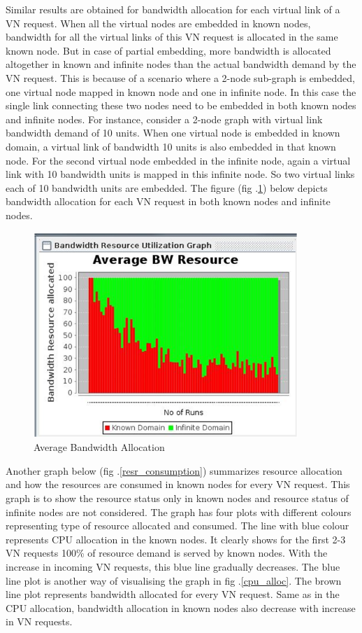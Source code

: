 \documentclass[article,dr=phil,type=msc ,colorback,accentcolor=tud4b]{tudthesis}
\begin{document}
Similar results are obtained for bandwidth allocation for each virtual link of a VN request. When all the virtual nodes are embedded in known nodes, bandwidth for all the virtual links of this VN request is allocated in the same known node. But in case of partial embedding, more bandwidth is allocated altogether in known and infinite nodes than the actual bandwidth demand by the VN request. This is because of a scenario where a 2-node sub-graph is embedded, one virtual node mapped in known node and one in infinite node. In this case the single link connecting these two nodes need to be embedded in both known nodes and infinite nodes. For instance, consider a 2-node graph with virtual link bandwidth demand of 10 units. When one virtual node is embedded in known domain, a virtual link of bandwidth 10 units is also embedded in that known node. For the second virtual node embedded in the infinite node, again a virtual link with 10 bandwidth units is mapped in this infinite node. So two virtual links each of 10 bandwidth units are embedded. The figure (fig .\ref{BW_alloc}) below depicts bandwidth allocation for each VN request in both known nodes and infinite nodes.
\begin{figure}[h]
	\centering
	\includegraphics[width=10cm]{BW_PE.png}
	\caption{Average Bandwidth Allocation}
	\label{BW_alloc}
\end{figure}

Another graph below (fig .\ref{resr_consumption}) summarizes resource allocation and how the resources are consumed in known nodes for every VN request. This graph is to show the resource status only in known nodes and resource status of infinite nodes are not considered. The graph has four plots with different colours representing type of resource allocated and consumed. The line with blue colour represents CPU allocation in the known nodes. It clearly shows for the first 2-3 VN requests 100\% of resource demand is served by known nodes. With the increase in incoming VN requests, this blue line gradually decreases. The blue line plot is another way of visualising the graph in fig .\ref{cpu_alloc}. The brown line plot represents bandwidth allocated for every VN request. Same as in the CPU allocation, bandwidth allocation in known nodes also decrease with increase in VN requests. \newline 
\end{document}
